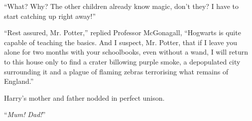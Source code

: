 ``What? Why? The other children already know magic, don't they? I have to start catching up right away!''

``Rest assured, Mr. Potter,'' replied Professor McGonagall, ``Hogwarts is quite capable of teaching the basics. And I suspect, Mr. Potter, that if I leave you alone for two months with your schoolbooks, even without a wand, I will return to this house only to find a crater billowing purple smoke, a depopulated city surrounding it and a plague of flaming zebras terrorising what remains of England.''

Harry's mother and father nodded in perfect unison.

``\emph{Mum! Dad!}''
